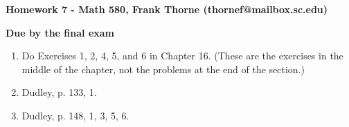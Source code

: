 \documentclass[12pt]{article}
\begin{document}
\setlength{\topmargin}{-2mm}





\begin{center}{\bf Homework 7 - Math 580, Frank Thorne (thornef@mailbox.sc.edu)}
\end{center}
\begin{center}
{\bf Due by the final exam}
\end{center}
\begin{enumerate}[(1)]
\item
Do Exercises 1, 2, 4, 5, and 6 in Chapter 16. (These are the exercises in the middle of the chapter,
not the problems at the end of the section.) 
\item
Dudley, p. 133, 1.
\item
Dudley, p. 148, 1, 3, 5, 6.
\end{enumerate}
\end{document}
